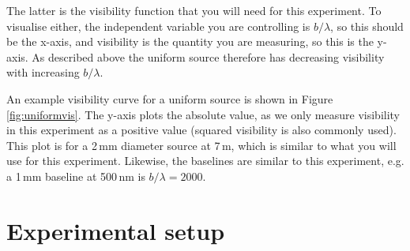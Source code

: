 \documentclass[11pt]{article}
\begin{document}
The latter is the visibility function that you will need for this experiment. To visualise either, the independent variable you are controlling is $b/\lambda$, so this should be the x-axis, and visibility is the quantity you are measuring, so this is the y-axis. As described above the uniform source therefore has decreasing visibility with increasing $b/\lambda$.

An example visibility curve for a uniform source is shown in Figure \ref{fig:uniformvis}. The y-axis plots the absolute value, as we only measure visibility in this experiment as a positive value (squared visibility is also commonly used). This plot is for a 2\,mm diameter source at 7\,m, which is similar to what you will use for this experiment. Likewise, the baselines are similar to this experiment, e.g. a 1\,mm baseline at 500\,nm is $b/\lambda=2000$.

\clearpage
\section{Experimental setup}
\end{document}
